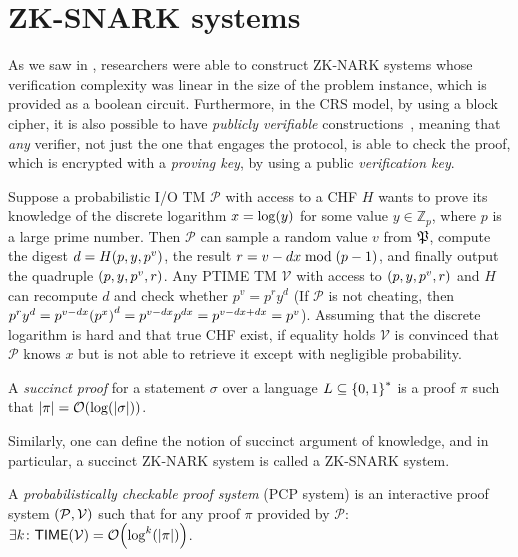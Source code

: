\section{ZK-SNARK systems}\label{sec:zk-snark}
As we saw in , researchers were able to construct ZK-NARK systems whose 
verification complexity was linear in the size of the problem instance, which is provided as a 
boolean circuit.
Furthermore, in the CRS model, by using a block cipher, it is also possible to have 
\emph{publicly verifiable} constructions~\cite{LapidotS1991}, meaning that \emph{any} verifier, 
not just the one that engages the protocol, is able to check the proof, which is encrypted with a 
\emph{proving key}, by using a public \emph{verification key}.

\begin{proposition}
  Suppose a probabilistic I/O TM \(\mathcal{P}\) with access to a CHF \(H\) wants to prove its 
  knowledge of the discrete logarithm \(x = \call{\log}{y}\) for some value 
  \(y \in \mathbb{Z}_p\), where \(p\) is a large prime number.
  Then \(\mathcal{P}\) can sample a random value \(v\) from \(\Taperand \), compute the digest 
  \(d = \call{H}{p, y, p^v}\), the result \(r = {v - dx} \bmod \Parens*{p - 1}\), and finally 
  output the quadruple \(\Tuple{p, y, p^v, r}\).
  Any \textnormal{\textsc{PTIME}} TM \(\mathcal{V}\) with access to \(\Tuple{p, y, p^v, r}\) 
  and \(H\) can recompute \(d\) and check whether \(p^v = p^{r}y^{d}\)
  (If \(\mathcal{P}\) is not cheating, then \(p^{r}y^{d} = p^{v - dx}\Parens*{p^{x}}^d = 
  p^{v - dx}p^{dx} = p^{v - dx + dx} = p^v\)).
  Assuming that the discrete logarithm is hard and that true CHF exist, if equality holds 
  \(\mathcal{V}\) is convinced that \(\mathcal{P}\) knows \(x\) but is not able to retrieve it 
  except with negligible probability.
\end{proposition}

\begin{definition}
  A \emph{succinct proof} for a statement \(\sigma \) over a language \(L \subseteq \Set{0, 1}^*\) 
  is a proof \(\pi \) such that \(\abs{\pi} = \BigO{\call{\log}{\abs{\sigma}}}\).
\end{definition}

Similarly, one can define the notion of succinct argument of knowledge, and in particular, a 
succinct ZK-NARK system is called a ZK-SNARK system.
\begin{definition}
  A \emph{probabilistically checkable proof system} (PCP system) is an interactive proof system 
  \(\Tuple{\mathcal{P, V}}\) such that for any proof \(\pi \) provided by \(\mathcal{P}\):
  \(\exists k\colon \call{\Time}{\mathcal{V}} = \BigO{\call{\log^k}{\abs{\pi}}}\).
\end{definition}

